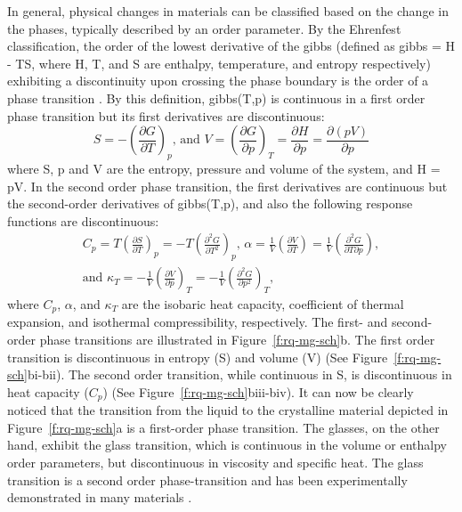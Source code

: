 In general, physical changes in materials can be classified based on the change in the phases, typically described by an order parameter. By the Ehrenfest classification, the order of the lowest derivative of the \glsdesc{gibbs} (defined as \gls{gibbs} = H - TS, where H, T, and S are enthalpy, temperature, and entropy respectively) exhibiting a discontinuity upon crossing the phase boundary is the order of a phase transition \cite{Jaeger1998}. By this definition, \gls{gibbs}(T,p) is continuous in a first order phase transition but its first derivatives are discontinuous:
\begin{equation}
	S = - \left( \frac{\partial G}{\partial T} \right)_p \text{, and } V = \left( \frac{\partial G}{\partial p} \right)_T = \frac{\partial H}{\partial p} =  \frac{\partial (pV)}{\partial p}
\end{equation}
where S, p and V are the entropy, pressure and volume of the system, and H = pV. In the second order phase transition, the first derivatives are continuous but the second-order derivatives of \gls{gibbs}(T,p), and also the following response functions are discontinuous:
\begin{equation}
\begin{gathered}
C_p = T\left(\frac{\partial S}{\partial T} \right)_p = -T \left( \frac{\partial^2 G}{\partial T^2} \right)_p \text{, } \alpha = \frac{1}{V} \left(\frac{\partial V}{\partial T} \right) = \frac{1}{V} \left(\frac{\partial^2 G}{\partial T \partial p} \right), \\
\text{and }\kappa_T = -\frac{1}{V} \left(\frac{\partial V}{\partial p} \right)_T = -\frac{1}{V} \left( \frac{\partial^2 G}{\partial p^2} \right)_T\text{,}
\end{gathered}
\end{equation}
where $C_p$, $\alpha$, and $\kappa _T$ are the isobaric heat capacity, coefficient of thermal expansion, and isothermal compressibility, respectively. The first- and second-order phase transitions are illustrated in Figure~\ref{f:rq-mg-sch}b. The first order transition is discontinuous in entropy (S) and volume (V) (See Figure~\ref{f:rq-mg-sch}bi-bii). The second order transition, while continuous in S, is discontinuous in heat capacity ($C_p$) (See Figure~\ref{f:rq-mg-sch}biii-biv). It can now be clearly noticed that the transition from the liquid to the crystalline material depicted in Figure~\ref{f:rq-mg-sch}a is a first-order phase transition. The glasses, on the other hand, exhibit the glass transition, which is continuous in the volume or enthalpy order parameters, but discontinuous in viscosity and specific heat. The glass transition is a second order phase-transition \cite{Cohen1959,Berthier2016} and has been experimentally demonstrated in many materials \cite{Kauzmann1948}. \par

